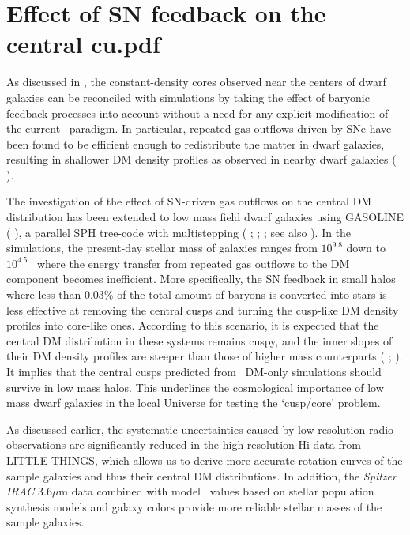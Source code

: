 \documentclass[natbib209]{emulateapj}
\begin{document}
\section{Effect of SN feedback on the central cu.pdf} \label{SN_FEEDBACK}

As discussed in \cite{Governato_2010}, the constant-density cores
observed near the centers of dwarf galaxies can be reconciled with simulations 
by taking the effect of baryonic feedback processes into account without a need 
for any explicit modification of the current \LCDM\ paradigm. In
particular, repeated gas outflows driven by SNe have been found to be efficient
enough to redistribute the matter in dwarf galaxies, resulting in shallower DM
density profiles as observed in nearby dwarf galaxies
(\citeauthor{Oh_2011b} \citeyear{Oh_2011b}).

The investigation of the effect of SN-driven gas outflows on the central DM
distribution has been extended to low mass field dwarf galaxies
using  GASOLINE (\citeauthor{Wadsley_2004} \citeyear{Wadsley_2004}), a
parallel SPH tree-code with multistepping (\citeauthor{Governato_2012}
\citeyear{Governato_2012}; \citeauthor{Pontzen_2012}
\citeyear{Pontzen_2012}; \citeauthor{2014MNRAS.437..415D}
\citeyear{2014MNRAS.437..415D}; see also \citeauthor{Pontzen_2014}
\citeyear{Pontzen_2014}). In the simulations,
the present-day stellar mass of galaxies ranges from $10^{9.8}$ down to
$10^{4.5}$ \Msun\ where the energy transfer from repeated gas outflows to the DM
component becomes inefficient. More specifically, the SN feedback in small halos
where less than 0.03\% of the total amount of baryons is converted into stars is
less effective at removing the central cusps and turning the cusp-like DM
density profiles into core-like ones. According to this scenario, it is expected that the central DM
distribution in these systems remains cuspy, and the inner slopes of their DM
density profiles are steeper than those of higher mass counterparts
(\citeauthor{Governato_2012} \citeyear{Governato_2012};
\citeauthor{Zolotov_2012} \citeyear{Zolotov_2012}). It implies that the central
cusps predicted from \LCDM\ DM-only simulations should survive in low mass halos.
This underlines the cosmological importance of low mass dwarf galaxies in the
local Universe for testing the `cusp/core' problem.

As discussed earlier, the systematic uncertainties caused by low resolution
radio observations are significantly reduced in the high-resolution H{\sc i} data
from LITTLE THINGS, which allows us to derive more accurate rotation curves of
the sample galaxies and thus their central DM distributions. In
addition, the {\it Spitzer IRAC} 3.6$\mu$m data combined with model \MLsps\ values based on
stellar population synthesis models and galaxy colors provide more reliable
stellar masses of the sample galaxies. 
\end{document}
